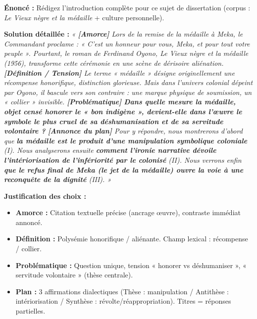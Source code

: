 \documentclass[11pt]{article}
\begin{document}
\begin{exoresolu}
\textbf{Énoncé :} Rédigez l'introduction complète pour ce sujet de dissertation (corpus : \emph{Le Vieux nègre et la médaille} + culture personnelle).

\tcblower
\textbf{Solution détaillée :}
\emph{« \textbf{[Amorce]} Lors de la remise de la médaille à Meka, le Commandant proclame : \emph{« C'est un honneur pour vous, Meka, et pour tout votre peuple »}. Pourtant, le roman de Ferdinand Oyono, \emph{Le Vieux nègre et la médaille} (1956), transforme cette cérémonie en une scène de dérisoire aliénation. \textbf{[Définition / Tension]} Le terme « médaille » désigne originellement une récompense honorifique, distinction glorieuse. Mais dans l'univers colonial dépeint par Oyono, il bascule vers son contraire : une marque physique de soumission, un « collier » invisible. \textbf{[Problématique]} \textbf{Dans quelle mesure la médaille, objet censé honorer le « bon indigène », devient-elle dans l'œuvre le symbole le plus cruel de sa déshumanisation et de sa servitude volontaire ?} \textbf{[Annonce du plan]} Pour y répondre, nous montrerons d'abord que \textbf{la médaille est le produit d'une manipulation symbolique coloniale} (I). Nous analyserons ensuite \textbf{comment l'ironie narrative dévoile l'intériorisation de l'infériorité par le colonisé} (II). Nous verrons enfin \textbf{que le refus final de Meka (le jet de la médaille) ouvre la voie à une reconquête de la dignité} (III). »}

\textbf{Justification des choix :}
\begin{itemize}
    \item \textbf{Amorce :} Citation textuelle précise (ancrage œuvre), contraste immédiat annoncé.
    \item \textbf{Définition :} Polysémie honorifique / aliénante. Champ lexical : récompense / collier.
    \item \textbf{Problématique :} Question unique, tension « honorer vs déshumaniser », « servitude volontaire » (thèse centrale).
    \item \textbf{Plan :} 3 affirmations dialectiques (Thèse : manipulation / Antithèse : intériorisation / Synthèse : révolte/réappropriation). Titres = réponses partielles.
\end{itemize}
\end{exoresolu}
\end{document}
